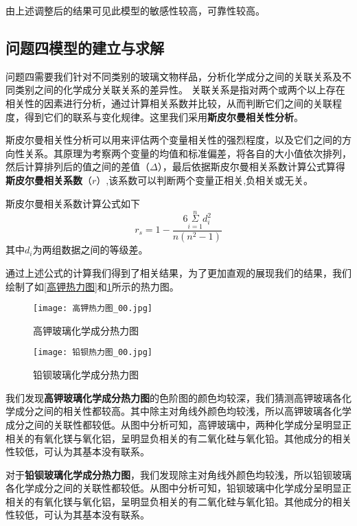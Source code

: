 \documentclass{MathModeling}
\begin{document}
  由上述调整后的结果可见此模型的敏感性较高，可靠性较高。

  \subsection{问题四模型的建立与求解}
  问题四需要我们针对不同类别的玻璃文物样品，分析化学成分之间的关联关系及不同类别之间的化学成分关联关系的差异性。
  关联关系是指对两个或两个以上存在相关性的因素进行分析，通过计算相关系数并比较，从而判断它们之间的关联程度，得到它们的联系与变化规律。这里我们采用{\textbf{斯皮尔曼相关性分析}}。

  斯皮尔曼相关性分析可以用来评估两个变量相关性的强烈程度，以及它们之间的方向性关系。其原理为考察两个变量的均值和标准偏差，将各自的大小值依次排列，然后计算排列后的值之间的差值（$\Delta$），最后依据斯皮尔曼相关系数计算公式算得{\textbf{斯皮尔曼相关系数}}（$r$）,该系数可以判断两个变量正相关,负相关或无关。
  
  斯皮尔曼相关系数计算公式如下
  \begin{equation}
	r_s=1-\frac{6\underset{i=1}{\overset{n}{\Sigma}}d_{i}^{2}}{n\left( n^2-1 \right)}
  \end{equation}
  其中$d_i$为两组数据之间的等级差。

  \newpage 
  通过上述公式的计算我们得到了相关结果，为了更加直观的展现我们的结果，我们绘制了如\textcolor{blue}{\cref{高钾热力图}}和\textcolor{blue}{\cref{铅钡热力图}}所示的热力图。
  \begin{figure}[htbp]
	\begin{minipage}[t]{0.5\textwidth}%
	\centering
	\texttt{[image: 高钾热力图\_00.jpg]}
	\caption{高钾玻璃化学成分热力图}%
	\label{高钾热力图}
	\end{minipage}
	\begin{minipage}[t]{0.5\textwidth}
	\centering
	\texttt{[image: 铅钡热力图\_00.jpg]}
	\caption{铅钡玻璃化学成分热力图}
	\label{铅钡热力图}
	\end{minipage}
  \end{figure}
  
  我们发现{\textbf{高钾玻璃化学成分热力图}}的色阶图的颜色均较深，我们猜测高钾玻璃各化学成分之间的相关性都较高。其中除主对角线外颜色均较浅，所以高钾玻璃各化学成分之间的关联性都较低。从图中分析可知，高钾玻璃中，两种化学成分呈明显正相关的有氧化镁与氧化铝，呈明显负相关的有二氧化硅与氧化铅。其他成分的相关性较低，可认为其基本没有联系。
  

  对于{\textbf{铅钡玻璃化学成分热力图}}，我们发现除主对角线外颜色均较浅，所以铅钡玻璃各化学成分之间的关联性都较低。从图中分析可知，铅钡玻璃中化学成分呈明显正相关的有氧化镁与氧化铝，呈明显负相关的有二氧化硅与氧化铅。其他成分的相关性较低，可认为其基本没有联系。
\end{document}
